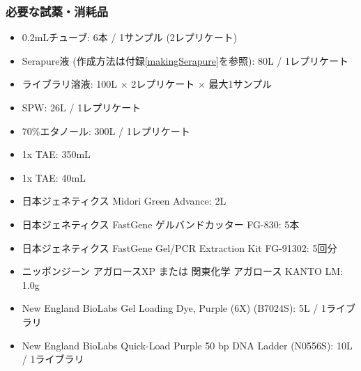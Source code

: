\documentclass[titlepage,10pt,a4paper,uplatex]{jsbook}
\begin{document}
\subsubsection{必要な試薬・消耗品}
\begin{itemize}
\item 0.2mLチューブ: 6本 / 1サンプル (2レプリケート)
\item Serapure液 (作成方法は付録\ref{makingSerapure}を参照): 80{\textmu}L / 1レプリケート
\item ライブラリ溶液: 100{\textmu}L × 2レプリケート × 最大1サンプル
\item SPW: 26{\textmu}L / 1レプリケート
\item 70\%エタノール: 300{\textmu}L / 1レプリケート
\item 1x TAE: 350mL
\item 1x TAE: 40mL
\item 日本ジェネティクス Midori Green Advance: 2{\textmu}L
\item 日本ジェネティクス FastGene ゲルバンドカッター FG-830: 5本
\item 日本ジェネティクス FastGene Gel/PCR Extraction Kit FG-91302: 5回分
\item ニッポンジーン アガロースXP または 関東化学 アガロース KANTO LM: 1.0g
\item New England BioLabs Gel Loading Dye, Purple (6X) (B7024S): 5{\textmu}L / 1ライブラリ
\item New England BioLabs Quick-Load Purple 50 bp DNA Ladder (N0556S): 10{\textmu}L / 1ライブラリ
\end{itemize}
\end{document}
